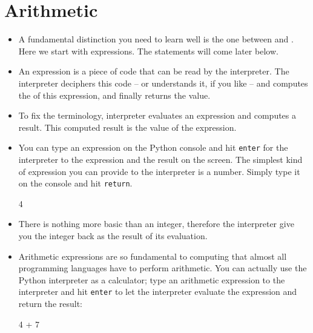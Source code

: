 \documentclass[a4paper]{article}
\begin{document}
\section{Arithmetic}

\begin{itemize}
\item A fundamental distinction you need to learn well is the one between
 and . Here we start with expressions. The
statements will come later below.

\item An expression is a piece of code that can be read by the interpreter. The
interpreter deciphers this code -- or understands it, if you like -- and
computes the  of this expression, and finally returns the value.

\item To fix the terminology, interpreter evaluates an expression and computes a
result. This computed result is the value of the expression.

\item You can type an expression on the Python console and hit \Verb+enter+ for the
interpreter to  the expression and  the result on the
screen. The simplest kind of expression you can provide to the interpreter is a
number. Simply type it on the console and hit \Verb+return+.

\begin{ucodeframe}
\begin{pyconsole}
4
\end{pyconsole}
\end{ucodeframe}

\item There is nothing more basic than an integer, therefore the interpreter
give you the integer back as the result of its evaluation.

\item Arithmetic expressions are so fundamental to computing that almost all
programming languages have  to perform arithmetic. You can
actually use the Python interpreter as a calculator; type an arithmetic
expression to the interpreter and hit \Verb+enter+ to let the interpreter evaluate
the expression and return the result:

\begin{ucodeframe}
\begin{pyconsole}
4 + 7
\end{pyconsole}
\end{ucodeframe}


\end{itemize}
\end{document}
